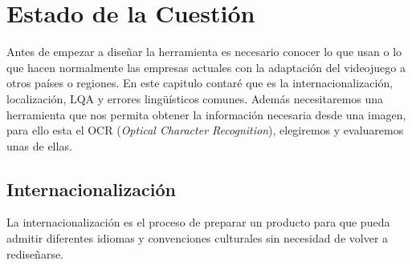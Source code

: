 \chapter{Estado de la Cuestión}
\label{cap:estadoDeLaCuestion}
Antes de empezar a diseñar la herramienta es necesario conocer lo que usan o lo que hacen normalmente las empresas actuales con la adaptación del videojuego a otros países o regiones. En este capitulo contaré que es la internacionalización, localización, LQA y errores lingüísticos comunes. Además necesitaremos una herramienta que nos permita obtener la información necesaria desde una imagen, para ello esta el OCR (\textit{Optical Character Recognition}), elegiremos y evaluaremos unas de ellas.

\section{Internacionalización}
\label{sec:Internacionalización}
La internacionalización es el proceso de preparar un producto para que pueda admitir diferentes idiomas y convenciones culturales sin necesidad de volver a rediseñarse.

